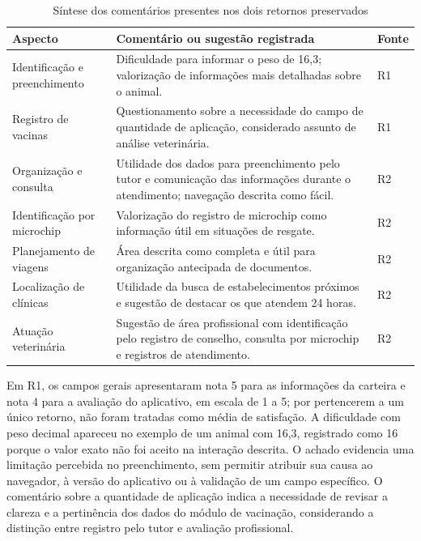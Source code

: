 \documentclass{UNESC}
\newcommand{\fonte}[1]{\par\noindent{\footnotesize\normalfont\raggedright Fonte: #1\par}}
\begin{document}
\begin{table}[htbp]
\centering
\caption{Síntese dos comentários presentes nos dois retornos preservados}
\label{tab:resumo_qualitativo}
\footnotesize
\setlength{\tabcolsep}{4pt}
\renewcommand{\arraystretch}{1.1}
\begin{tabularx}{\linewidth}{@{}L{.24\linewidth}Y L{.10\linewidth}@{}}
\hline
\textbf{Aspecto} & \textbf{Comentário ou sugestão registrada} & \textbf{Fonte} \\
\hline
Identificação e preenchimento & Dificuldade para informar o peso de 16,3; valorização de informações mais detalhadas sobre o animal. & R1 \\
Registro de vacinas & Questionamento sobre a necessidade do campo de quantidade de aplicação, considerado assunto de análise veterinária. & R1 \\
Organização e consulta & Utilidade dos dados para preenchimento pelo tutor e comunicação das informações durante o atendimento; navegação descrita como fácil. & R2 \\
Identificação por microchip & Valorização do registro de microchip como informação útil em situações de resgate. & R2 \\
Planejamento de viagens & Área descrita como completa e útil para organização antecipada de documentos. & R2 \\
Localização de clínicas & Utilidade da busca de estabelecimentos próximos e sugestão de destacar os que atendem 24 horas. & R2 \\
Atuação veterinária & Sugestão de área profissional com identificação pelo registro de conselho, consulta por microchip e registros de atendimento. & R2 \\
\hline
\end{tabularx}
\fonte{Elaborado pelo autor.}
\end{table}

Em R1, os campos gerais apresentaram nota 5 para as informações da carteira e nota 4 para a avaliação do aplicativo, em escala de 1 a 5; por pertencerem a um único retorno, não foram tratadas como média de satisfação. A dificuldade com peso decimal apareceu no exemplo de um animal com 16,3, registrado como 16 porque o valor exato não foi aceito na interação descrita. O achado evidencia uma limitação percebida no preenchimento, sem permitir atribuir sua causa ao navegador, à versão do aplicativo ou à validação de um campo específico. O comentário sobre a quantidade de aplicação indica a necessidade de revisar a clareza e a pertinência dos dados do módulo de vacinação, considerando a distinção entre registro pelo tutor e avaliação profissional.
\end{document}
